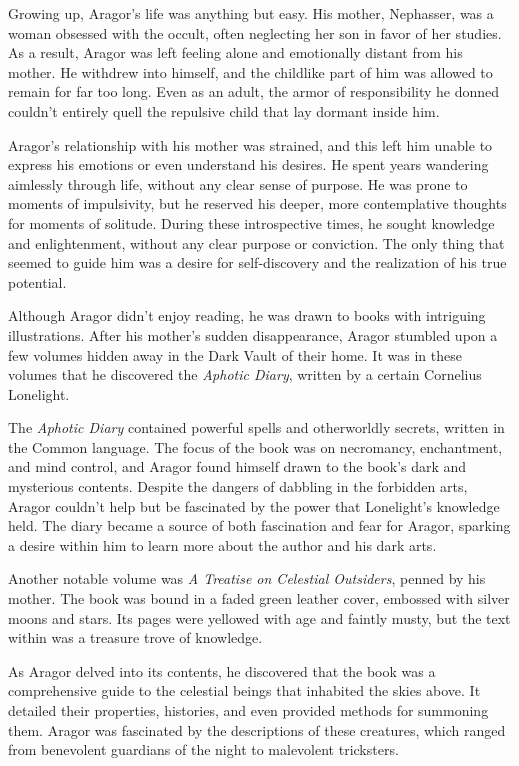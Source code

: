 Growing up, Aragor's life was anything but easy. His mother, Nephasser, was a woman obsessed with the occult, often neglecting her son in favor of her studies. As a result, Aragor was left feeling alone and emotionally distant from his mother. He withdrew into himself, and the childlike part of him was allowed to remain for far too long. Even as an adult, the armor of responsibility he donned couldn't entirely quell the repulsive child that lay dormant inside him.

Aragor's relationship with his mother was strained, and this left him unable to express his emotions or even understand his desires. He spent years wandering aimlessly through life, without any clear sense of purpose. He was prone to moments of impulsivity, but he reserved his deeper, more contemplative thoughts for moments of solitude. During these introspective times, he sought knowledge and enlightenment, without any clear purpose or conviction. The only thing that seemed to guide him was a desire for self-discovery and the realization of his true potential.

Although Aragor didn't enjoy reading, he was drawn to books with intriguing illustrations. After his mother's sudden disappearance, Aragor stumbled upon a few volumes hidden away in the Dark Vault of their home. It was in these volumes that he discovered the \textit{Aphotic Diary}, written by a certain Cornelius Lonelight.

The \textit{Aphotic Diary} contained powerful spells and otherworldly secrets, written in the Common language. The focus of the book was on necromancy, enchantment, and mind control, and Aragor found himself drawn to the book's dark and mysterious contents. Despite the dangers of dabbling in the forbidden arts, Aragor couldn't help but be fascinated by the power that Lonelight's knowledge held. The diary became a source of both fascination and fear for Aragor, sparking a desire within him to learn more about the author and his dark arts.

Another notable volume was \textit{A Treatise on Celestial Outsiders}, penned by his mother. The book was bound in a faded green leather cover, embossed with silver moons and stars. Its pages were yellowed with age and faintly musty, but the text within was a treasure trove of knowledge.

As Aragor delved into its contents, he discovered that the book was a comprehensive guide to the celestial beings that inhabited the skies above. It detailed their properties, histories, and even provided methods for summoning them. Aragor was fascinated by the descriptions of these creatures, which ranged from benevolent guardians of the night to malevolent tricksters.

